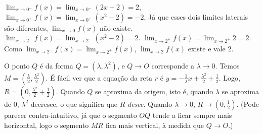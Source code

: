 \begin{Solution}{4.30}
$\lim_{x\to 0^-}f(x)=\lim_{x\to 0^-}(2x+2)=2$,
$\lim_{x\to 0^+}f(x)=\lim_{x\to 0^+}(x^2-2)=-2$,
Já que esses dois limites laterais são diferentes, $\lim_{x\to 0}f(x)$ não
existe.
$\lim_{x\to 2^-}f(x)=\lim_{x\to 2^-}(x^2-2)=2$.
$\lim_{x\to 2^+}f(x)=\lim_{x\to 2^+}2=2$. Como
$\lim_{x\to 2^-}f(x)=\lim_{x\to 2^+}f(x)$, $\lim_{x\to 2}f(x)$ existe e vale
$2$.
\begin{center}
\begin{bmlimage}\end{bmlimage}
\end{center}
\end{Solution}
\begin{Solution}{4.31}
O ponto $Q$ é da forma $Q=(\lambda,\lambda^2)$, e $Q\to O$
corresponde a $\lambda\to 0$.
Temos $M=(\frac{\lambda}{2},\frac{\lambda^2}{2})$.
É fácil ver que a equação da reta $r$ é
$y=-\frac{1}{\lambda}x+\frac{\lambda^2}{2}+\frac12$. Logo,
$R=(0,\frac{\lambda^2}{2}+\frac12)$. Quando $Q$ se aproxima da origem,
isto é, quando $\lambda$ se aproxima de $0$, $\lambda^2$ decresce,
o que significa que $R$ \emph{desce}. Quando $\lambda\to 0$, $R\to
(0,\frac12)$. (Pode parecer contra-intuitivo, já que o segmento $OQ$ tende a
ficar sempre mais horizontal, logo o segmento $MR$ fica mais vertical, à medida
que $Q\to O$.)
\end{Solution}
